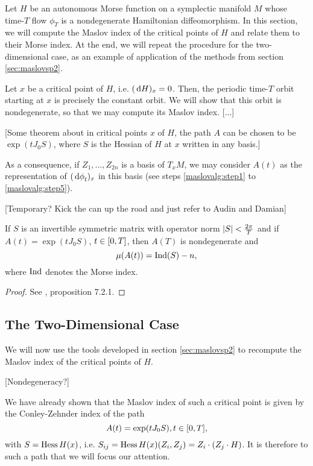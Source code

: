 Let $H$ be an autonomous Morse function on a symplectic manifold $M$ whose time-$T$ flow $\phi_T$ is a nondegenerate Hamiltonian diffeomorphism. In this section, we will compute the Maslov index of the critical points of $H$ and relate them to their Morse index. At the end, we will repeat the procedure for the two-dimensional case, as an example of application of the methods from section \ref{sec:maslovsp2}.

Let $x$ be a critical point of $H$, i.e. $(\dl H)_x = 0$. Then, the periodic time-$T$ orbit starting at $x$ is precisely the constant orbit. We will show that this orbit is nondegenerate, so that we may compute its Maslov index.
[...]

[Some theorem about in critical points $x$ of $H$, the path $A$ can be chosen to be $\exp(t J_0 S)$, where $S$ is the Hessian of $H$ at $x$ written in any basis.]

As a consequence, if $Z_1, \dots, Z_{2n}$ is a basis of $T_x M$, we may consider $A(t)$ as the representation of $(\dl \phi_t)_x$ in this basis (see steps \ref{maslovalg:step1} to \ref{maslovalg:step5}).

[Temporary? Kick the can up the road and just refer to Audin and Damian]

\begin{theorem}
If $S$ is an invertible symmetric matrix with operator norm $\lvert S\rvert < \frac{2\pi}T$ and if $A(t) = \exp(t J_0 S)$, $t \in \interval 0 T$, then $A(T)$ is nondegenerate and
\begin{equation}
\mu(A(t)) = \operatorname{Ind}(S) - n,
\end{equation}
where $\operatorname{Ind}$ denotes the Morse index.
\end{theorem}

\begin{proof}
See \cite{audin}, proposition 7.2.1.
\end{proof}

\subsection{The Two-Dimensional Case}

We will now use the tools developed in section \ref{sec:maslovsp2} to recompute the Maslov index of the critical points of $H$.

[Nondegeneracy?]

We have already shown that the Maslov index of such a critical point is given by the Conley-Zehnder index of the path
\begin{equation}
A(t) = \exp(t J_0 S), t \in \interval 0 T,
\end{equation}
with $S = \operatorname{Hess} H(x)$, i.e. $S_{ij} = \operatorname{Hess} H(x)(Z_i, Z_j) = Z_i \cdot (Z_j \cdot H)$. It is therefore to such a path that we will focus our attention.

